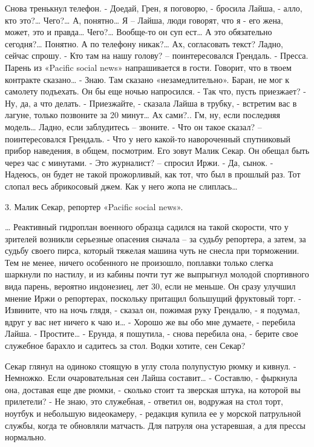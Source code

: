 \documentclass{book}
\begin{document}
Снова тренькнул телефон.
- Доедай, Грен, я поговорю, - бросила Лайша, - алло, кто это?\ldots{} Чего?\ldots{} А, понятно\ldots{} Я -- Лайша, люди говорят, что я - его жена, может, это и правда\ldots{} Чего?\ldots{} Вообще-то он суп ест\ldots{} А это обязательно сегодня?\ldots{} Понятно. А по телефону никак?\ldots{} Ах, согласовать текст? Ладно, сейчас спрошу.
- Кто там на нашу голову? -- поинтересовался Грендаль.
- Пресса. Парень из «Pacific social news» напрашивается в гости. Говорит, что в твоем контракте сказано\ldots{}
- Знаю. Там сказано «незамедлительно». Баран, не мог к самолету подъехать. Он бы еще ночью напросился.
- Так что, пусть приезжает?
- Ну, да, а что делать.
- Приезжайте, - сказала Лайша в трубку, - встретим вас в лагуне, только позвоните за 20 минут\ldots{} Ах сами?.. Гм, ну, если последняя модель\ldots{} Ладно, если заблудитесь -- звоните.
- Что он такое сказал? -- поинтересовался Грендаль.
- Что у него какой-то навороченный спутниковый прибор наведения, в общем, посмотрим. Его зовут Малик Секар. Он обещал быть через час с минутами.
- Это журналист? -- спросил Иржи.
- Да, сынок.
- Надеюсь, он будет не такой прожорливый, как тот, что был в прошлый раз. Тот слопал весь абрикосовый джем. Как у него жопа не слиплась\ldots{}



3. Малик Секар, репортер «Pacific social news».


\ldots{} Реактивный гидроплан военного образца садился на такой скорости, что у зрителей возникли серьезные опасения сначала -- за судьбу репортера, а затем, за судьбу своего пирса, который тяжелая машина чуть не снесла при торможении. Тем не менее, ничего особенного не произошло, поплавки только слегка шаркнули по настилу, и из кабины почти тут же выпрыгнул молодой спортивного вида парень, вероятно индонезиец, лет 30, если не меньше. Он сразу улучшил мнение Иржи о репортерах, поскольку притащил большущий фруктовый торт.
- Извините, что на ночь глядя, - сказал он, пожимая руку Грендалю, - я подумал, вдруг у вас нет ничего к чаю и\ldots{}
- Хорошо же вы обо мне думаете, - перебила Лайша.
- Простите\ldots{}
- Ерунда, я пошутила, - снова перебила она, - берите свое служебное барахло и садитесь за стол. Водки хотите, сен Секар?

Секар глянул на одиноко стоящую в углу стола полупустую рюмку и кивнул.
- Немножко. Если очаровательная сен Лайша составит\ldots{}
- Составлю, - фыркнула она, доставая еще две рюмки, - сколько стоит та зверская штука, на которой вы прилетели?
- Не знаю, это служебная, - ответил он, водружая на стол торт, ноутбук и небольшую видеокамеру, - редакция купила ее у морской патрульной службы, когда те обновляли матчасть. Для патруля она устаревшая, а для прессы нормально.
\end{document}
